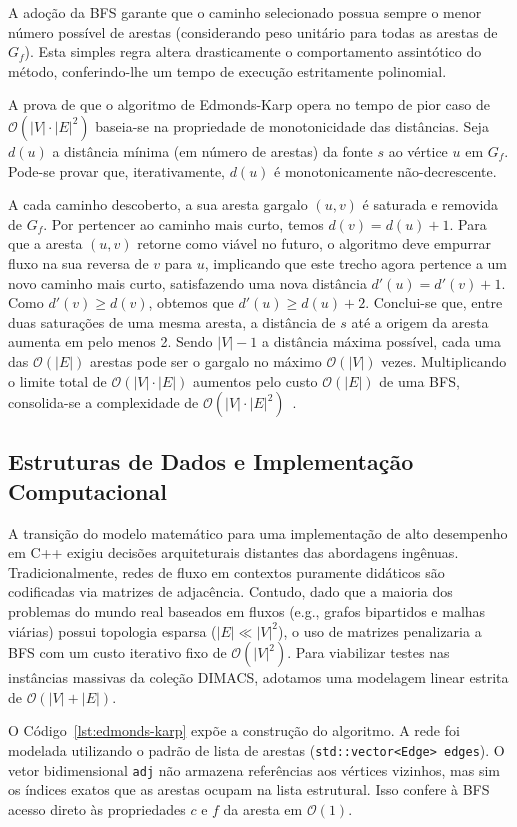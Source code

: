 \documentclass[12pt,a4paper]{article}
\begin{document}
A adoção da BFS garante que o caminho selecionado possua sempre o menor número possível de arestas (considerando peso unitário para todas as arestas de $G_f$). Esta simples regra altera drasticamente o comportamento assintótico do método, conferindo-lhe um tempo de execução estritamente polinomial.

A prova de que o algoritmo de Edmonds-Karp opera no tempo de pior caso de $\mathcal{O}(|V| \cdot |E|^2)$ baseia-se na propriedade de monotonicidade das distâncias. Seja $d(u)$ a distância mínima (em número de arestas) da fonte $s$ ao vértice $u$ em $G_f$. Pode-se provar que, iterativamente, $d(u)$ é monotonicamente não-decrescente. 

A cada caminho descoberto, a sua aresta gargalo $(u, v)$ é saturada e removida de $G_f$. Por pertencer ao caminho mais curto, temos $d(v) = d(u) + 1$. Para que a aresta $(u, v)$ retorne como viável no futuro, o algoritmo deve empurrar fluxo na sua reversa de $v$ para $u$, implicando que este trecho agora pertence a um novo caminho mais curto, satisfazendo uma nova distância $d'(u) = d'(v) + 1$. Como $d'(v) \ge d(v)$, obtemos que $d'(u) \ge d(u) + 2$. Conclui-se que, entre duas saturações de uma mesma aresta, a distância de $s$ até a origem da aresta aumenta em pelo menos 2. Sendo $|V| - 1$ a distância máxima possível, cada uma das $\mathcal{O}(|E|)$ arestas pode ser o gargalo no máximo $\mathcal{O}(|V|)$ vezes. Multiplicando o limite total de $\mathcal{O}(|V| \cdot |E|)$ aumentos pelo custo $\mathcal{O}(|E|)$ de uma BFS, consolida-se a complexidade de $\mathcal{O}(|V| \cdot |E|^2)$~\cite{ahuja1993network}.

\subsection{Estruturas de Dados e Implementação Computacional}
A transição do modelo matemático para uma implementação de alto desempenho em C++ exigiu decisões arquiteturais distantes das abordagens ingênuas. Tradicionalmente, redes de fluxo em contextos puramente didáticos são codificadas via matrizes de adjacência. Contudo, dado que a maioria dos problemas do mundo real baseados em fluxos (e.g., grafos bipartidos e malhas viárias) possui topologia esparsa ($|E| \ll |V|^2$), o uso de matrizes penalizaria a BFS com um custo iterativo fixo de $\mathcal{O}(|V|^2)$. Para viabilizar testes nas instâncias massivas da coleção DIMACS, adotamos uma modelagem linear estrita de $\mathcal{O}(|V| + |E|)$.

O Código~\ref{lst:edmonds-karp} expõe a construção do algoritmo. A rede foi modelada utilizando o padrão de lista de arestas (\lstinline|std::vector<Edge> edges|). O vetor bidimensional \lstinline|adj| não armazena referências aos vértices vizinhos, mas sim os índices exatos que as arestas ocupam na lista estrutural. Isso confere à BFS acesso direto às propriedades $c$ e $f$ da aresta em $\mathcal{O}(1)$.
\end{document}
